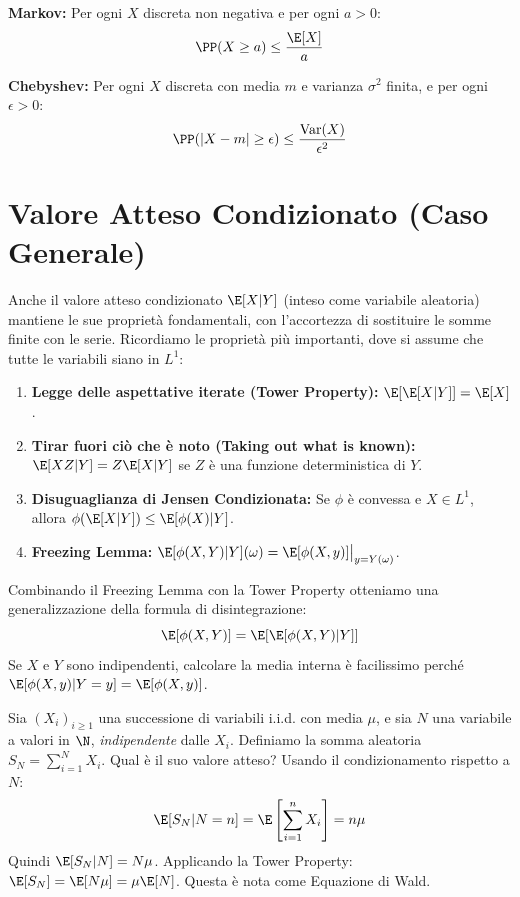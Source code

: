 \begin{theorem}
\textbf{Markov:} Per ogni $X$ discreta non negativa e per ogni $a > 0$:
\[ \PP(X \ge a) \le \frac{\E[X]}{a} \]

\textbf{Chebyshev:} Per ogni $X$ discreta con media $m$ e varianza $\sigma^2$ finita, e per ogni $\epsilon > 0$:
\[ \PP(|X - m| \ge \epsilon) \le \frac{\operatorname{Var}(X)}{\epsilon^2} \]
\end{theorem}

\section{Valore Atteso Condizionato (Caso Generale)}

Anche il valore atteso condizionato $\E[X|Y]$ (inteso come variabile aleatoria) mantiene le sue proprietà fondamentali, con l'accortezza di sostituire le somme finite con le serie.
Ricordiamo le proprietà più importanti, dove si assume che tutte le variabili siano in $L^1$:
\begin{enumerate}
    \item \textbf{Legge delle aspettative iterate (Tower Property):} $\E[\E[X|Y]] = \E[X]$.
    \item \textbf{Tirar fuori ciò che è noto (Taking out what is known):} $\E[X Z | Y] = Z \E[X | Y]$ se $Z$ è una funzione deterministica di $Y$.
    \item \textbf{Disuguaglianza di Jensen Condizionata:} Se $\phi$ è convessa e $X \in L^1$, allora $\phi(\E[X|Y]) \le \E[\phi(X)|Y]$.
    \item \textbf{Freezing Lemma:} $\E[\phi(X,Y)|Y](\omega) = \E[\phi(X, y)]\big|_{y=Y(\omega)}$.
\end{enumerate}

\begin{hint}
    Combinando il Freezing Lemma con la Tower Property otteniamo una generalizzazione della formula di disintegrazione:
    \[ \E[\phi(X,Y)] = \E[\E[\phi(X,Y)|Y]] \]
    Se $X$ e $Y$ sono indipendenti, calcolare la media interna è facilissimo perché $\E[\phi(X,y)|Y=y] = \E[\phi(X,y)]$.
\end{hint}

\begin{esempio}
Sia $(X_i)_{i \ge 1}$ una successione di variabili i.i.d. con media $\mu$, e sia $N$ una variabile a valori in $\N$, \emph{indipendente} dalle $X_i$. Definiamo la somma aleatoria $S_N = \sum_{i=1}^N X_i$.
Qual è il suo valore atteso? Usando il condizionamento rispetto a $N$:
\[ \E[S_N|N=n] = \E\left[\sum_{i=1}^n X_i\right] = n\mu \]
Quindi $\E[S_N|N] = N\mu$. Applicando la Tower Property: $\E[S_N] = \E[N\mu] = \mu \E[N]$. Questa è nota come Equazione di Wald.
\end{esempio}

